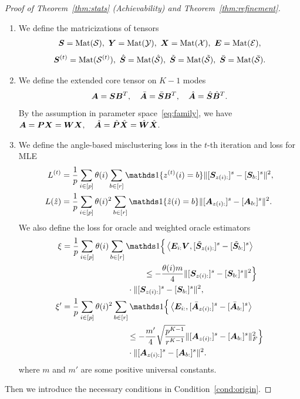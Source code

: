 \documentclass[journal]{IEEEtran}
\theoremstyle{definition}
\theoremstyle{definition}
\newcommand{\ang}[1]{\left\langle#1\right\rangle}
\begin{document}
\begin{proof}[Proof of Theorem~\ref{thm:stats} (Achievability) and Theorem~\ref{thm:refinement}]
{\begin{enumerate}[wide]
    \item We define the matricizations of tensors
    \begin{align}
        \bm S = \text{Mat}(\mathcal{S}), \  \bm Y = \text{Mat}(\mathcal{Y}), \  \bm X = \text{Mat}(\mathcal{X}), \  \bm{E} = \text{Mat}(\mathcal{E}),
    \end{align}
    \begin{equation}
        \bm S^{(t)} = \text{Mat}(\mathcal{S}^{(t)}), \   \hat {\bm S} = \text{Mat}(\hat {\mathcal{S}}), \  \tilde {\bm S} = \text{Mat}(\tilde {\mathcal{S}}), \  \bar {\bm S} = \text{Mat}( \bar {\mathcal{S}} ).
    \end{equation}
    \item We define the extended core tensor on $K-1$ modes
    \begin{equation}
        \bm A = \bm S \bm B^T , \quad \bar {\bm A} = \bar {\bm S} \bm B^T, \quad \hat {\bm A} = \hat {\bm S} \hat {\bm B}^T.
    \end{equation}
    By the assumption in parameter space~\eqref{eq:family}, we have $\bm A = \bm{P} \bm X = \bm{W} \bm X, \quad \hat {\bm A} = \hat {\bm{P}} \hat {\bm X} = \hat {\bm{W}} \hat {\bm X}.$

    \item We define the angle-based misclustering loss in the $t$-th iteration and loss for MLE
    \begin{align}
        L^{(t)} &= \frac{1}{p}  \sum_{i \in [p]} \theta(i) \sum_{b \in [r]}  \ind \{ z^{(t)}(i) = b \} \onormSize{}{ [ \mS_{ z(i):}  ]^s - [ \mS_{b:}  ]^s  }^2, \\
         L(\hat z)& = \frac{1}{p} \sum_{i \in [p]} \theta(i)^2 \sum_{b \in [r]} \ind\{ \hat z(i) = b\} \onormSize{}{[\mA_{z(i):}]^s - [\mA_{b:}]^s}^2.
    \end{align}
    We also define the loss for oracle and weighted oracle estimators
    \begin{align}
         \xi & = \frac{1}{p} \sum_{i \in [p]} \theta(i) \sum_{b \in [r]} \ind \Big\{\ang{ \mE_{i:} \mV, [  \tilde \mS_{z(i):} ]^s - [  \tilde \mS_{b:} ]^s} \\
         & \quad \quad \quad \quad \quad \quad \quad \quad \quad \quad \leq - \frac{ \theta(i) m}{4} \onormSize{}{ [ \mS_{z(i):}  ]^s - [ \mS_{b:}  ]^s  }^2 \Big\} \\
         & \quad \quad \quad \quad \quad \quad \quad \quad \cdot \onormSize{}{ [ \mS_{z(i):}  ]^s - [ \mS_{ b:}  ]^s  }^2,\\
         \xi' & = \frac{1}{p} \sum_{i \in [p]} \theta(i)^2 \sum_{b \in [r]} \ind \Big\{\ang{\mE_{i:}, [\bar \mA_{z(i):}]^s - [\bar \mA_{b:}]^s } \\
         & \quad \quad \quad \quad \quad \quad \quad \quad  \leq - \frac{m'}{4}  \sqrt{\frac{p^{K-1}}{r^{K-1}}} \onormSize{}{ [\mA_{z(i):}]^s -  [\mA_{b:}]^s  }_F^2 \Big\} \\
         & \quad \quad \quad \quad \quad \quad \quad \quad \cdot \onormSize{}{[\mA_{z(i):}]^s - [\mA_{b:}]^s}^2.
    \end{align}
    where $m$ and $m'$ are some positive universal constants.
\end{enumerate}
Then we introduce the necessary conditions in Condition~\ref{cond:origin}.

}
\end{proof}
\end{document}
